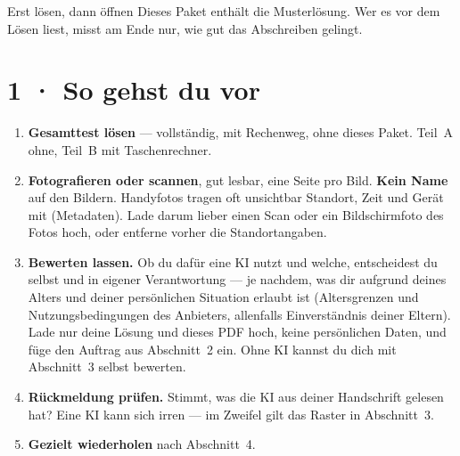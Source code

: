 \documentclass[11pt]{article}
\begin{document}

\begin{lpachtung}{Erst lösen, dann öffnen}
Dieses Paket enthält die Musterlösung. Wer es vor dem Lösen liest, misst am Ende nur, wie gut das Abschreiben gelingt.
\end{lpachtung}

\section*{1 · So gehst du vor}
\begin{enumerate}[leftmargin=*,itemsep=2pt]
\item \textbf{Gesamttest lösen} — vollständig, mit Rechenweg, ohne dieses Paket. Teil~A ohne, Teil~B mit Taschenrechner.
\item \textbf{Fotografieren oder scannen}, gut lesbar, eine Seite pro Bild. \textbf{Kein Name} auf den Bildern.
  Handyfotos tragen oft unsichtbar Standort, Zeit und Gerät mit (Metadaten). Lade darum lieber einen Scan oder ein
  Bildschirmfoto des Fotos hoch, oder entferne vorher die Standortangaben.
\item \textbf{Bewerten lassen.} Ob du dafür eine KI nutzt und welche, entscheidest du selbst und in eigener Verantwortung —
  je nachdem, was dir aufgrund deines Alters und deiner persönlichen Situation erlaubt ist (Altersgrenzen und
  Nutzungsbedingungen des Anbieters, allenfalls Einverständnis deiner Eltern). Lade nur deine Lösung und dieses PDF hoch,
  keine persönlichen Daten, und füge den Auftrag aus Abschnitt~2 ein. Ohne KI kannst du dich mit Abschnitt~3 selbst bewerten.
\item \textbf{Rückmeldung prüfen.} Stimmt, was die KI aus deiner Handschrift gelesen hat? Eine KI kann sich irren —
  im Zweifel gilt das Raster in Abschnitt~3.
\item \textbf{Gezielt wiederholen} nach Abschnitt~4.
\end{enumerate}

\end{document}
